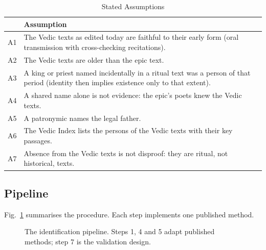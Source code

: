 \documentclass[journal]{IEEEtran}
\begin{document}
\begin{table}[!t]
\caption{Stated Assumptions}
\label{tab:assumptions}
\centering\footnotesize
\begin{tabularx}{\columnwidth}{@{}lX@{}}
\toprule
& Assumption \\
\midrule
A1 & The Vedic texts as edited today are faithful to their early form (oral transmission with cross-checking recitations). \\
A2 & The Vedic texts are older than the epic text. \\
A3 & A king or priest named incidentally in a ritual text was a person of that period (identity then implies existence only to that extent). \\
A4 & A shared name alone is not evidence: the epic's poets knew the Vedic texts. \\
A5 & A patronymic names the legal father. \\
A6 & The Vedic Index lists the persons of the Vedic texts with their key passages. \\
A7 & Absence from the Vedic texts is not disproof: they are ritual, not historical, texts. \\
\bottomrule
\end{tabularx}
\end{table}

\subsection{Pipeline}
Fig.~\ref{fig:pipeline} summarises the procedure. Each step implements one published method.

\begin{figure}[!t]
\centering
{}
\caption{The identification pipeline. Steps 1, 4 and 5 adapt published methods; step 7 is the validation design.}
\label{fig:pipeline}
\end{figure}
\end{document}
